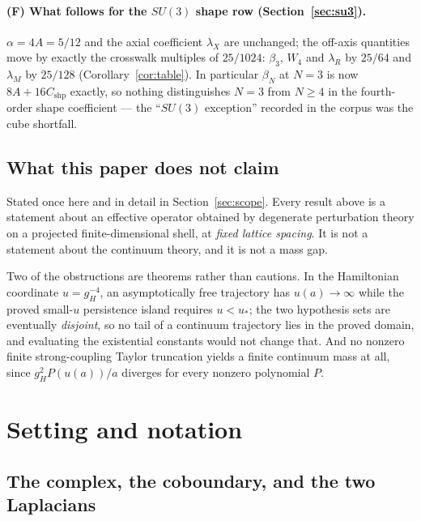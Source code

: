 \documentclass[11pt]{article}
\theoremstyle{definition}
\theoremstyle{remark}
\begin{document}
\paragraph{(F) What follows for the $SU(3)$ shape row
(Section~\ref{sec:su3}).}
$\alpha=4A=5/12$ and the axial coefficient $\lambda_X$ are unchanged; the
off-axis quantities move by exactly the crosswalk multiples of $25/1024$:
$\beta_3$, $W_4$ and $\lambda_R$ by $25/64$ and $\lambda_M$ by $25/128$
(Corollary~\ref{cor:table}). In particular $\beta_N$ at $N=3$ is now
$8A+16C_{\mathrm{shp}}$ exactly, so nothing distinguishes $N=3$ from $N\ge4$ in
the fourth-order shape coefficient --- the ``$SU(3)$ exception'' recorded in
the corpus was the cube shortfall.

\subsection{What this paper does not claim}\label{sec:notclaim}

Stated once here and in detail in Section~\ref{sec:scope}. Every result above
is a statement about an effective operator obtained by degenerate perturbation
theory on a projected finite-dimensional shell, at \emph{fixed lattice
spacing}. It is not a statement about the continuum theory, and it is not a
mass gap.

Two of the obstructions are theorems rather than cautions. In the Hamiltonian
coordinate $u=g_H^{-4}$, an asymptotically free trajectory has $u(a)\to\infty$
while the proved small-$u$ persistence island requires $u<u_*$; the two
hypothesis sets are eventually \emph{disjoint}, so no tail of a continuum
trajectory lies in the proved domain, and evaluating the existential constants
would not change that. And no nonzero finite strong-coupling Taylor truncation
yields a finite continuum mass at all, since $g_H^2P(u(a))/a$ diverges for
every nonzero polynomial $P$.

\section{Setting and notation}\label{sec:setting}

\subsection{The complex, the coboundary, and the two Laplacians}
\end{document}
